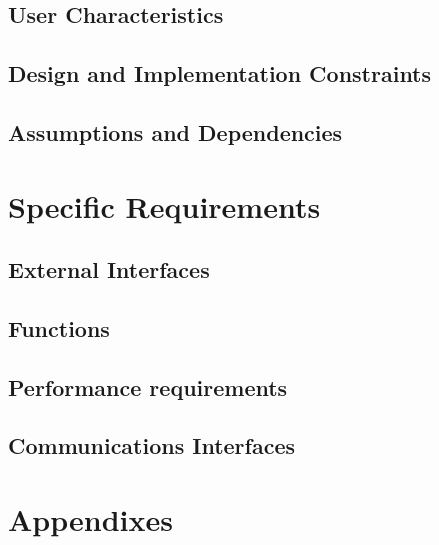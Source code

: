 \documentclass{article}
\begin{document}
	\subsection{User Characteristics}
	\subsection{Design and Implementation Constraints}
	\subsection{Assumptions and Dependencies}

\section{Specific Requirements}
	\subsection{External Interfaces}
	\subsection{Functions}
	\subsection{Performance requirements}
	\subsection{Communications Interfaces}

\section{Appendixes}
\end{document}
